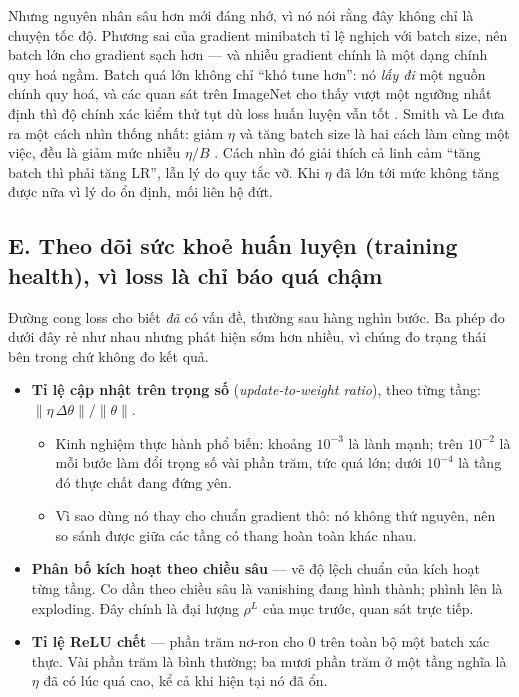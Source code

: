 \documentclass[../../../deep_learning.tex]{subfiles}
\begin{document}
Nhưng nguyên nhân sâu hơn mới đáng nhớ, vì nó nói rằng đây không chỉ là chuyện tốc độ. Phương sai của gradient minibatch tỉ lệ nghịch với batch size, nên batch lớn cho gradient sạch hơn --- và nhiễu gradient chính là một dạng chính quy hoá ngầm. Batch quá lớn không chỉ ``khó tune hơn'': nó \emph{lấy đi} một nguồn chính quy hoá, và các quan sát trên ImageNet cho thấy vượt một ngưỡng nhất định thì độ chính xác kiểm thử tụt dù loss huấn luyện vẫn tốt \cite{keskar2017large}. Smith và Le đưa ra một cách nhìn thống nhất: giảm \(\eta\) và tăng batch size là hai cách làm cùng một việc, đều là giảm mức nhiễu \(\eta/B\) \cite{smith2018dont}. Cách nhìn đó giải thích cả linh cảm ``tăng batch thì phải tăng LR'', lẫn lý do quy tắc vỡ. Khi \(\eta\) đã lớn tới mức không tăng được nữa vì lý do ổn định, mối liên hệ đứt.

\subsection{E. Theo dõi sức khoẻ huấn luyện (training health), vì loss là chỉ báo quá chậm}
Đường cong loss cho biết \emph{đã} có vấn đề, thường sau hàng nghìn bước. Ba phép đo dưới đây rẻ như nhau nhưng phát hiện sớm hơn nhiều, vì chúng đo trạng thái bên trong chứ không đo kết quả.

\begin{itemize}
\item \textbf{Tỉ lệ cập nhật trên trọng số} (\emph{update-to-weight ratio}), theo từng tầng: \(\|\eta\,\Delta\theta\|/\|\theta\|\).
  \begin{itemize}
  \item Kinh nghiệm thực hành phổ biến: khoảng \(10^{-3}\) là lành mạnh; trên \(10^{-2}\) là mỗi bước làm đổi trọng số vài phần trăm, tức quá lớn; dưới \(10^{-4}\) là tầng đó thực chất đang đứng yên.
  \item Vì sao dùng nó thay cho chuẩn gradient thô: nó không thứ nguyên, nên so sánh được giữa các tầng có thang hoàn toàn khác nhau.
  \end{itemize}
\item \textbf{Phân bố kích hoạt theo chiều sâu} --- vẽ độ lệch chuẩn của kích hoạt từng tầng. Co dần theo chiều sâu là vanishing đang hình thành; phình lên là exploding. Đây chính là đại lượng \(\rho^{L}\) của mục trước, quan sát trực tiếp.
\item \textbf{Tỉ lệ ReLU chết} --- phần trăm nơ-ron cho \(0\) trên toàn bộ một batch xác thực. Vài phần trăm là bình thường; ba mươi phần trăm ở một tầng nghĩa là \(\eta\) đã có lúc quá cao, kể cả khi hiện tại nó đã ổn.
\end{itemize}
\end{document}
